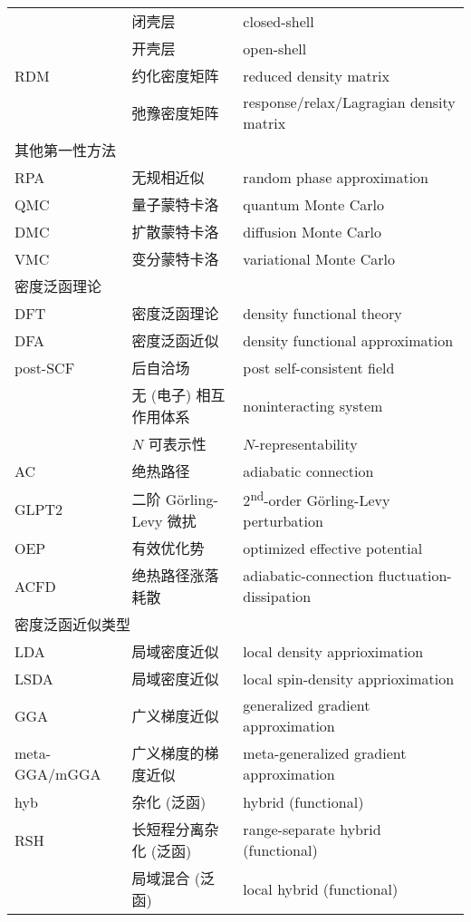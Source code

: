 \begin{longtable}{lll}
    & 闭壳层 & closed-shell \\
    & 开壳层 & open-shell \\
    RDM & 约化密度矩阵 & reduced density matrix \\
    & 弛豫密度矩阵 & response/relax/Lagragian density matrix \\
    \midrule
    \multicolumn{3}{l}{\textsf{其他第一性方法}} \\
    RPA & 无规相近似 & random phase approximation \\
    QMC & 量子蒙特卡洛 & quantum Monte Carlo \\
    DMC & 扩散蒙特卡洛 & diffusion Monte Carlo \\
    VMC & 变分蒙特卡洛 & variational Monte Carlo \\
    \midrule
    \multicolumn{3}{l}{\textsf{密度泛函理论}} \\
    DFT & 密度泛函理论 & density functional theory \\
    DFA & 密度泛函近似 & density functional approximation \\
    post-SCF & 后自洽场 & post self-consistent field \\
    & 无 (电子) 相互作用体系 & noninteracting system \\
    & $N$ 可表示性 & $N$-representability \\
    AC & 绝热路径 & adiabatic connection \\
    GLPT2 & 二阶 G{\"o}rling-Levy 微扰 & 2\textsuperscript{nd}-order G{\"o}rling-Levy perturbation \\
    OEP & 有效优化势 & optimized effective potential \\
    ACFD & 绝热路径涨落耗散 & adiabatic-connection fluctuation-dissipation \\
    \midrule
    \multicolumn{3}{l}{\textsf{密度泛函近似类型}} \\
    LDA & 局域密度近似 & local density apprioximation \\
    LSDA & 局域密度近似 & local spin-density apprioximation \\
    GGA & 广义梯度近似 & generalized gradient approximation \\
    meta-GGA/mGGA & 广义梯度的梯度近似 & meta-generalized gradient approximation \\
    hyb & 杂化 (泛函) & hybrid (functional) \\
    RSH & 长短程分离杂化 (泛函) & range-separate hybrid (functional) \\
    & 局域混合 (泛函) & local hybrid (functional) \\

\end{longtable}
